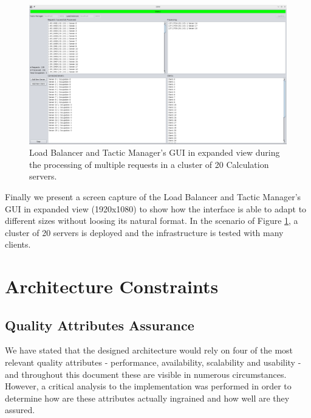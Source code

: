 \documentclass[12pt]{article}
\begin{document}
\begin{figure}[H]
  \centering
  \begin{minipage}{\textwidth}
    \centering
    \includegraphics[width=\linewidth]{img/LBM_large.png}
  \end{minipage}%
  \caption{Load Balancer and Tactic Manager's GUI in expanded view during the processing of multiple requests in a cluster of 20 Calculation servers.}
  \label{fig:LBM_large}
\end{figure} 

Finally we present a screen capture of the Load Balancer and Tactic Manager's GUI in expanded view (1920x1080) to show how the interface is able to adapt to 
different sizes without loosing its natural format.
In the scenario of Figure \ref{fig:LBM_large}, a cluster of 20 servers is deployed and the infrastructure is tested with many clients.

\newpage
\section{Architecture Constraints} \label{constraints} %

\subsection{Quality Attributes Assurance} \label{qaa} %

We have stated that the designed architecture would rely on four of the most relevant quality attributes - performance, availability, scalability and usability - 
and throughout this document these are visible in numerous circumstances.
However, a critical analysis to the implementation was performed in order to determine how are these attributes actually ingrained and how well are they assured.
\end{document}
